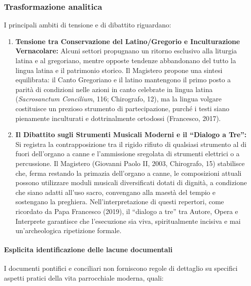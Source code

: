 \documentclass[12pt,a4paper]{article}
\begin{document}
	\subsubsection{Trasformazione analitica}\label{trasformazione-analitica-15}
	
	I principali ambiti di tensione e di dibattito riguardano:
	
	\begin{enumerate}[label=\arabic*.,leftmargin=*]
		\item \textbf{Tensione tra Conservazione del Latino/Gregorio e Inculturazione Vernacolare:} Alcuni settori propugnano un ritorno esclusivo alla liturgia latina e al gregoriano, mentre opposte tendenze abbandonano del tutto la lingua latina e il patrimonio storico. Il Magistero propone una sintesi equilibrata: il Canto Gregoriano e il latino mantengono il primo posto a parità di condizioni nelle azioni in canto celebrate in lingua latina (\emph{Sacrosanctum Concilium}, 116; Chirografo, 12), ma la lingua volgare costituisce un prezioso strumento di partecipazione, purché i testi siano pienamente inculturati e dottrinalmente ortodossi (Francesco, 2017).
		\item \textbf{Il Dibattito sugli Strumenti Musicali Moderni e il ``Dialogo a Tre'':} Si registra la contrapposizione tra il rigido rifiuto di qualsiasi strumento al di fuori dell'organo a canne e l'ammissione sregolata di strumenti elettrici o a percussione. Il Magistero (Giovanni Paolo II, 2003, Chirografo, 15) stabilisce che, ferma restando la primazia dell'organo a canne, le composizioni attuali possono utilizzare moduli musicali diversificati dotati di dignità, a condizione che siano adatti all'uso sacro, convengano alla maestà del tempio e sostengano la preghiera. Nell'interpretazione di questi repertori, come ricordato da Papa Francesco (2019), il ``dialogo a tre'' tra Autore, Opera e Interprete garantisce che l'esecuzione sia viva, spiritualmente incisiva e mai un'archeologica ripetizione formale.
	\end{enumerate}
	
	\paragraph{Esplicita identificazione delle lacune documentali}\label{esplicita-identificazione-delle-lacune-documentali}
	
	I documenti pontifici e conciliari non forniscono regole di dettaglio su specifici aspetti pratici della vita parrocchiale moderna, quali:
	
\end{document}
